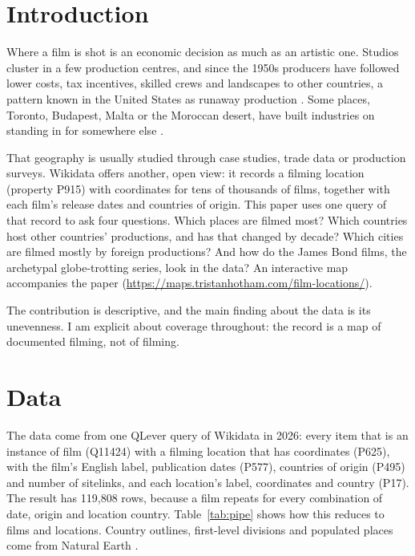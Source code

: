 \documentclass[11pt,a4paper]{article}
\begin{document}
\section{Introduction}
Where a film is shot is an economic decision as much as an artistic one. Studios cluster in a few production centres, and since the 1950s producers have followed lower costs, tax incentives, skilled crews and landscapes to other countries, a pattern known in the United States as runaway production \citep{miller,goldsmith}. Some places, Toronto, Budapest, Malta or the Moroccan desert, have built industries on standing in for somewhere else \citep{scott}.

That geography is usually studied through case studies, trade data or production surveys. Wikidata \citep{wikidata} offers another, open view: it records a filming location (property P915) with coordinates for tens of thousands of films, together with each film's release dates and countries of origin. This paper uses one query of that record to ask four questions. Which places are filmed most? Which countries host other countries' productions, and has that changed by decade? Which cities are filmed mostly by foreign productions? And how do the James Bond films, the archetypal globe-trotting series, look in the data? An interactive map accompanies the paper (\url{https://maps.tristanhotham.com/film-locations/}).

The contribution is descriptive, and the main finding about the data is its unevenness. I am explicit about coverage throughout: the record is a map of documented filming, not of filming.

\section{Data}
The data come from one QLever \citep{qlever} query of Wikidata in 2026: every item that is an instance of film (Q11424) with a filming location that has coordinates (P625), with the film's English label, publication dates (P577), countries of origin (P495) and number of sitelinks, and each location's label, coordinates and country (P17). The result has 119,808 rows, because a film repeats for every combination of date, origin and location country. Table~\ref{tab:pipe} shows how this reduces to films and locations. Country outlines, first-level divisions and populated places come from Natural Earth \citep{naturalearth}.
\end{document}
